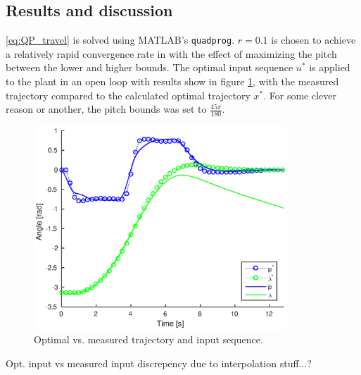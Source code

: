 \subsection{Results and discussion}
\eqref{eq:QP_travel} is solved using MATLAB's \texttt{quadprog}. $r = 0.1$ is chosen to achieve a relatively rapid convergence rate in with the effect of maximizing the pitch between the lower and higher bounds. The optimal input sequence $u^*$ is applied to the plant in an open loop with results show in figure \ref{fig:opt_openloop}, with the measured trajectory compared to the calculated optimal trajectory $x^*$. For some clever reason or another, the pitch bounds was set to $\frac{45 \pi}{180}$.

\begin{figure}[hp]
	\centering
		\includegraphics[width=0.85\textwidth]{figures/2/openloop.eps}
	\caption{Optimal vs. measured trajectory and input sequence.}
	\label{fig:opt_openloop}
\end{figure}

Opt. input vs measured input discrepency due to interpolation stuff...?

